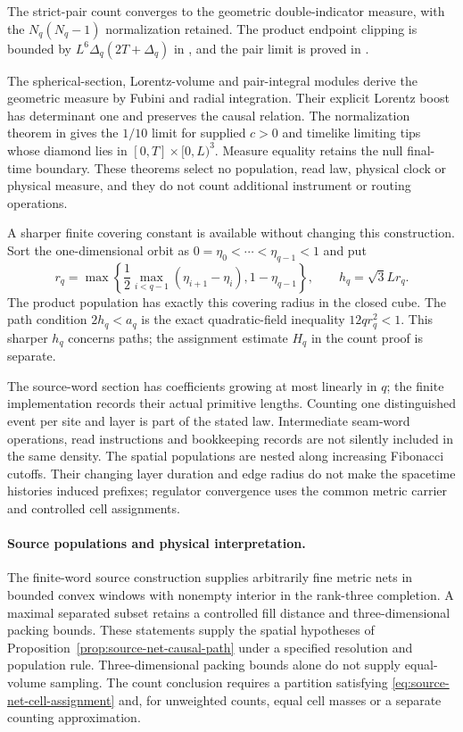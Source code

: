 The strict-pair count converges to the geometric double-indicator measure,
with the $N_q(N_q-1)$ normalization retained. The product endpoint
clipping is bounded by $L^6\Delta_q(2T+\Delta_q)$ in
, and the pair limit is proved
in .

The spherical-section, Lorentz-volume and pair-integral modules derive the
geometric measure by Fubini and radial integration. Their explicit Lorentz
boost has determinant one and preserves the causal relation.
The normalization theorem in
 gives the $1/10$ limit
for supplied $c>0$ and timelike limiting tips whose diamond lies in
$[0,T]\times[0,L)^3$. Measure equality retains the null final-time boundary.
These theorems select no population, read law, physical clock or physical
measure, and they do not count additional instrument or routing operations.

A sharper finite covering constant is available without changing this
construction. Sort the one-dimensional orbit as
$0=\eta_0<\cdots<\eta_{q-1}<1$ and put
\[
 r_q=\max\left\{\frac12\max_{i<q-1}(\eta_{i+1}-\eta_i),
                     1-\eta_{q-1}\right\},\qquad
 h_q=\sqrt3 Lr_q.
\]
The product population has exactly this covering radius in the closed
cube. The path condition $2h_q<a_q$ is the exact quadratic-field inequality
$12qr_q^2<1$. This sharper $h_q$ concerns paths; the assignment estimate
$H_q$ in the count proof is separate.

The source-word section has coefficients growing at most linearly in $q$;
the finite implementation records their actual primitive lengths.
Counting one distinguished event per site and layer is part of the stated
law. Intermediate seam-word operations, read instructions and bookkeeping
records are not silently included in the same density. The spatial
populations are nested along increasing Fibonacci cutoffs. Their changing
layer duration and edge radius do not make the spacetime histories induced
prefixes; regulator convergence uses the common metric carrier and controlled
cell assignments.

\paragraph{Source populations and physical interpretation.}
The finite-word source construction supplies arbitrarily fine metric nets
in bounded convex windows with nonempty interior in the rank-three
completion. A maximal separated
subset retains a controlled fill distance and three-dimensional packing
bounds. These statements supply the spatial hypotheses of
Proposition~\ref{prop:source-net-causal-path} under a specified resolution
and population rule. Three-dimensional packing bounds alone do not supply
equal-volume sampling. The count conclusion requires a partition satisfying
\eqref{eq:source-net-cell-assignment} and, for unweighted counts, equal
cell masses or a separate counting approximation.

